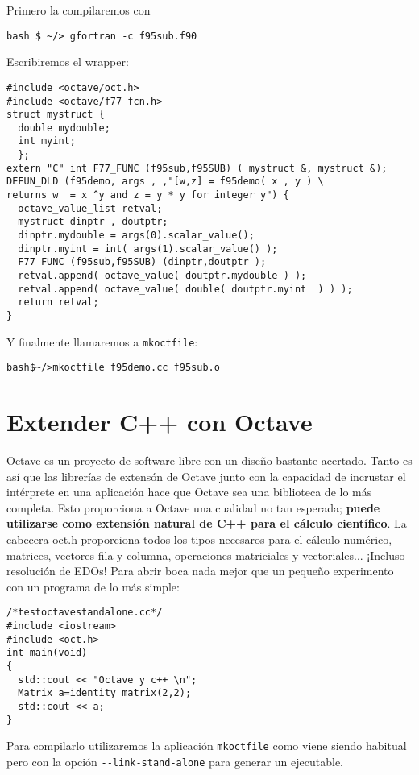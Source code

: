 Primero la compilaremos con

\begin{verbatim}
bash $ ~/> gfortran -c f95sub.f90
\end{verbatim}

Escribiremos el wrapper:
\begin{verbatim}
#include <octave/oct.h>
#include <octave/f77-fcn.h>
struct mystruct {
  double mydouble;
  int myint;
  };
extern "C" int F77_FUNC (f95sub,f95SUB) ( mystruct &, mystruct &); 
DEFUN_DLD (f95demo, args , ,"[w,z] = f95demo( x , y ) \
returns w  = x ^y and z = y * y for integer y") {
  octave_value_list retval;
  mystruct dinptr , doutptr;
  dinptr.mydouble = args(0).scalar_value();
  dinptr.myint = int( args(1).scalar_value() );
  F77_FUNC (f95sub,f95SUB) (dinptr,doutptr );
  retval.append( octave_value( doutptr.mydouble ) );
  retval.append( octave_value( double( doutptr.myint  ) ) );
  return retval;
}
\end{verbatim}
Y finalmente llamaremos a \texttt{mkoctfile}:
\begin{verbatim}
bash$~/>mkoctfile f95demo.cc f95sub.o
\end{verbatim}

\section{Extender C++ con Octave}

Octave es un proyecto de software libre con un diseño bastante
acertado.  Tanto es así que las librerías de extensón de Octave junto
con la capacidad de incrustar el intérprete en una aplicación hace que
Octave sea una biblioteca de lo más completa. Esto proporciona a
Octave una cualidad no tan esperada; \textbf{puede utilizarse como
  extensión natural de C++ para el cálculo científico}. La cabecera
oct.h proporciona todos los tipos necesaros para el cálculo numérico,
matrices, vectores fila y columna, operaciones matriciales y
vectoriales... ¡Incluso resolución de EDOs! Para abrir boca nada mejor
que un pequeño experimento con un programa de lo más simple:

\begin{verbatim}
/*testoctavestandalone.cc*/
#include <iostream>
#include <oct.h>
int main(void)
{
  std::cout << "Octave y c++ \n";
  Matrix a=identity_matrix(2,2);
  std::cout << a;
}
\end{verbatim}

Para compilarlo utilizaremos la aplicación \texttt{mkoctfile} como
viene siendo habitual pero con la opción \texttt{-{}-link-stand-alone}
para generar un ejecutable.


